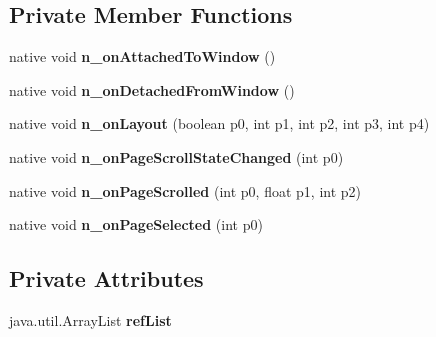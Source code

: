 \subsection*{Private Member Functions}
\begin{DoxyCompactItemize}
\item 
\mbox{\label{classmd5270abb39e60627f0f200893b490a1ade_1_1CarouselPageRenderer_a3f13b7b13f3447c1c7192520900c5777}} 
native void {\bfseries n\+\_\+on\+Attached\+To\+Window} ()
\item 
\mbox{\label{classmd5270abb39e60627f0f200893b490a1ade_1_1CarouselPageRenderer_a8d62856586e2da23d0d3f8f26d5bd4ba}} 
native void {\bfseries n\+\_\+on\+Detached\+From\+Window} ()
\item 
\mbox{\label{classmd5270abb39e60627f0f200893b490a1ade_1_1CarouselPageRenderer_a20a089cd60211dba7bd4767bee115a9e}} 
native void {\bfseries n\+\_\+on\+Layout} (boolean p0, int p1, int p2, int p3, int p4)
\item 
\mbox{\label{classmd5270abb39e60627f0f200893b490a1ade_1_1CarouselPageRenderer_a41963e1af7e5310a4730f4c2485aec69}} 
native void {\bfseries n\+\_\+on\+Page\+Scroll\+State\+Changed} (int p0)
\item 
\mbox{\label{classmd5270abb39e60627f0f200893b490a1ade_1_1CarouselPageRenderer_a54806a422e44f11b84b52905c7f88314}} 
native void {\bfseries n\+\_\+on\+Page\+Scrolled} (int p0, float p1, int p2)
\item 
\mbox{\label{classmd5270abb39e60627f0f200893b490a1ade_1_1CarouselPageRenderer_ab84a3441e29c02bf48219aeaeb010773}} 
native void {\bfseries n\+\_\+on\+Page\+Selected} (int p0)
\end{DoxyCompactItemize}
\subsection*{Private Attributes}
\begin{DoxyCompactItemize}
\item 
\mbox{\label{classmd5270abb39e60627f0f200893b490a1ade_1_1CarouselPageRenderer_ad48d9d828a4c63961f1670b716f7dacb}} 
java.\+util.\+Array\+List {\bfseries ref\+List}
\end{DoxyCompactItemize}


